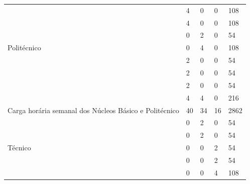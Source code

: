 \documentclass[11pt,fleqn]{book} %
\begin{document}
\begin{table}[H]
{\begin{tabular}{|l|l|l|l|l|l|}
			\multirow{7}{*}{Politécnico}   
			& \nameref{disc:quimica}                                                       & 4          & 0         & 0         & 108       \\ \cline{2-6} 
			& \nameref{disc:biologia}                                                      & 4          & 0         & 0         & 108       \\ \cline{2-6} 	
			& \nameref{disc:bioquimica}                                                    & 0          & 2         & 0         & 54        \\ \cline{2-6} 
			& \nameref{disc:biomol}                                                        & 0          & 4         & 0         & 108        \\ \cline{2-6} 
			& \nameref{disc:bioetica}                                                      & 2          & 0         & 0         & 54        \\ \cline{2-6} 		
			& \nameref{disc:bioseg}                                                        & 2          & 0         & 0         & 54        \\ \cline{2-6} 		
			& \nameref{disc:info}                                                          & 2          & 0         & 0         & 54        \\ \cline{2-6} 
			& \nameref{disc:pratica}                                                       & 4          & 4         & 0         & 216       \\ \hline	
			\multicolumn{2}{|l|}{Carga horária semanal dos Núcleos Básico  e Politécnico}  & 40         & 34        & 16        & 2862      \\ \hline
			\multirow{7}{*}{Técnico}       
			& \nameref{disc:biotecAnimal}                                                  & 0          & 2         & 0         & 54        \\ \cline{2-6} 
			& \nameref{disc:biotecVegetal}                                                 & 0          & 2         & 0         & 54        \\ \cline{2-6} 
			& \nameref{disc:biotecAlimentos}                                               & 0          & 0         & 2         & 54       \\ \cline{2-6} 
			& \nameref{disc:biotecFarmacos}                                                & 0          & 0         & 2         & 54        \\ \cline{2-6} 
			& \nameref{disc:biotecSaude}                                                   & 0          & 0         & 4         & 108       \\ \cline{2-6} 

\end{tabular}}
\end{table}
\end{document}

